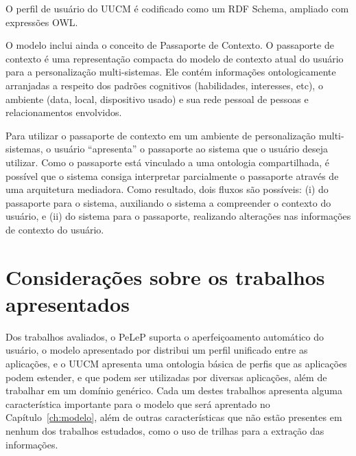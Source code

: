 O perfil de usuário do UUCM é codificado como um RDF Schema\cite{rdf}, ampliado com expressões OWL.

O modelo inclui ainda o conceito de Passaporte de Contexto. O passaporte de contexto é uma representação compacta do modelo de contexto atual do usuário para a personalização multi-sistemas. Ele contém informações ontologicamente arranjadas a respeito dos padrões cognitivos (habilidades, interesses, etc), o ambiente (data, local, dispositivo usado) e sua rede pessoal de pessoas e relacionamentos envolvidos.

Para utilizar o passaporte de contexto em um ambiente de personalização multi-sistemas, o usuário ``apresenta'' o passaporte ao sistema que o usuário deseja utilizar. Como o passaporte está vinculado a uma ontologia compartilhada, é possível que o sistema consiga interpretar parcialmente o passaporte através de uma arquitetura mediadora. Como resultado, dois fluxos são possíveis: (i) do passaporte para o sistema, auxiliando o sistema a compreender o contexto do usuário, e (ii) do sistema para o passaporte, realizando alterações nas informações de contexto do usuário.


\section{Considerações sobre os trabalhos apresentados}

Dos trabalhos avaliados, o PeLeP suporta o aperfeiçoamento automático do usuário, o modelo apresentado por  distribui um perfil unificado entre as aplicações, e o UUCM apresenta uma ontologia básica de perfis que as aplicações podem estender, e que podem ser utilizadas por diversas aplicações, além de trabalhar em um domínio genérico. Cada um destes trabalhos apresenta alguma característica importante para o modelo que será aprentado no Capítulo~\ref{ch:modelo}, além de outras características que não estão presentes em nenhum dos trabalhos estudados, como o uso de trilhas para a extração das informações.
